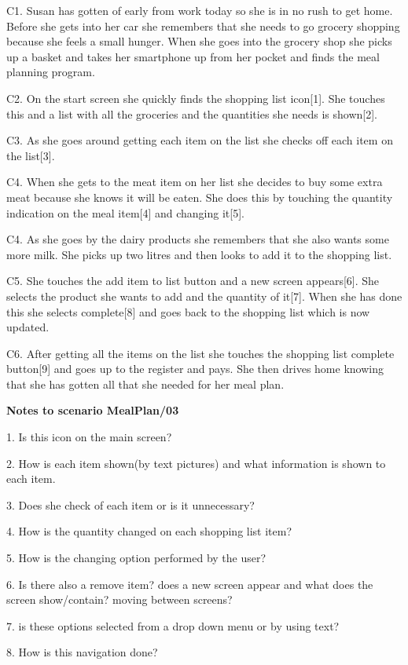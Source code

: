 	C1. Susan has gotten of early from work today so she is in no rush to get home. Before she gets into her car she remembers that she needs to go grocery shopping because she feels a small hunger. When she goes into the grocery shop she picks up a basket and takes her smartphone up from her pocket and finds the meal planning program.
	
	C2. On the start screen she quickly finds the shopping list icon[1]. She touches this and a list with all the groceries and the quantities she needs is shown[2].
	
	C3. As she goes around getting each item on the list she checks off each item on the list[3].
	
	C4. When she gets to the meat item on her list she decides to buy some extra meat because she knows it will be eaten. She does this by touching the quantity indication on the meal item[4] and changing it[5]. 	
	
	C4. As she goes by the dairy products she remembers that she also wants some more milk. She picks up two litres and then looks to add it to the shopping list.
	
	C5. She touches the add item to list button and a new screen appears[6]. She selects the product she wants to add and the quantity of it[7]. When she has done this she selects complete[8] and goes back to the shopping list which is now updated.
	
	C6. After getting all the items on the list she touches the shopping list complete button[9] and goes up to the register and pays. She then drives home knowing that she has gotten all that she needed for her meal plan.    
	
\textbf{Notes to scenario MealPlan/03}

1. Is this icon on the main screen?

2. How is each item shown(by text pictures) and what information is shown to each item.

3. Does she check of each item or is it unnecessary?

4. How is the quantity changed on each shopping list item?  

5. How is the changing option performed by the user?

6. Is there also a remove item? does a new screen appear and what does the screen show/contain? moving between screens?

7. is these options selected from a drop down menu or by using text?

8. How is this navigation done?

